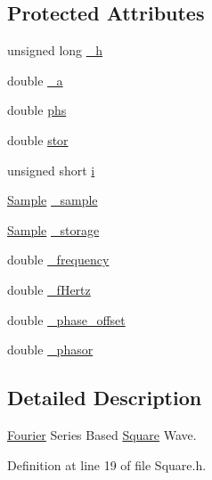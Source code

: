 \subsection*{Protected Attributes}
\begin{DoxyCompactItemize}
\item 
unsigned long \hyperlink{classSignal_1_1Fourier_1_1Square_a289e48f696976033845c704970e4de80}{\+\_\+h}
\item 
double \hyperlink{classSignal_1_1Fourier_1_1Square_a1de35055cfcab4d4bae2d72273c34f3f}{\+\_\+a}
\item 
double \hyperlink{classSignal_1_1Fourier_1_1Square_a3a18caa52584be9a6a1777804d42120e}{phs}
\item 
double \hyperlink{classSignal_1_1Fourier_1_1Square_a47ec083d36cef49c7d6583c8741b7905}{stor}
\item 
unsigned short \hyperlink{classSignal_1_1Fourier_1_1Square_a942768cca477bd9bfc71f9a3ea1be8e5}{i}
\item 
\hyperlink{classSignal_1_1Sample}{Sample} \hyperlink{classSignal_1_1Fourier_1_1FourierGenerator_ad720bf2b268dc621ace64c54c0816597}{\+\_\+sample}
\item 
\hyperlink{classSignal_1_1Sample}{Sample} \hyperlink{classSignal_1_1Fourier_1_1FourierGenerator_ab6e6b79cf56e31c9a1b5766f357f8cfb}{\+\_\+storage}
\item 
double \hyperlink{classSignal_1_1SignalGenerator_a7f107461333bce68c5dad412db96a8c2}{\+\_\+frequency}
\item 
double \hyperlink{classSignal_1_1SignalGenerator_a85a4702347352bab1c71e0a8df8437d6}{\+\_\+f\+Hertz}
\item 
double \hyperlink{classSignal_1_1SignalGenerator_a6b4444d46747c8517171edbbf4b5588f}{\+\_\+phase\+\_\+offset}
\item 
double \hyperlink{classSignal_1_1SignalGenerator_af4aa0728ded00777be26a06d883eaeb3}{\+\_\+phasor}
\end{DoxyCompactItemize}


\subsection{Detailed Description}
\hyperlink{namespaceSignal_1_1Fourier}{Fourier} Series Based \hyperlink{classSignal_1_1Fourier_1_1Square}{Square} Wave. 

Definition at line 19 of file Square.\+h.



